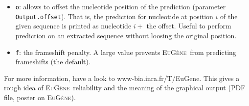 \documentclass[a4paper,titlepage]{report}
\newcommand{\EuGenie}{\textsc{EuG\`ene}}
\begin{document}
\begin{itemize}
\item \texttt{o}: allows to offset the nucleotide position of the prediction
  (parameter \texttt{Output.offset}).  That is, the prediction for
  nucleotide at position $i$ of the given sequence is printed as
  nucleotide $i+$ the offset. Useful to perform prediction on an
  extracted sequence without loosing the original position.
  
\item \texttt{f}: the frameshift penalty. A large value prevents
  \EuGenie\ from predicting frameshifts (the default).
\end{itemize}




For more information, have a look to
\textsf{www-bia.inra.fr/T/EuGene}. This gives a rough idea of
\EuGenie\ reliability and the meaning of the graphical output (PDF
file, poster on \EuGenie).
\end{document}
